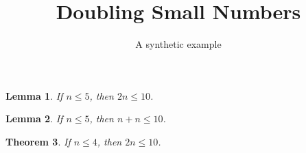 \documentclass[11pt]{article}
\title{Doubling Small Numbers}
\author{A synthetic example}
\date{}
\newtheorem{theorem}{Theorem}
\newtheorem{lemma}[theorem]{Lemma}
\newcommand{\lean}[1]{}
\begin{document}
\maketitle

\begin{lemma}\label{lem:ten}\lean{MainUse.le_ten}
If $n \le 5$, then $2n \le 10$.
\end{lemma}

\begin{lemma}\label{lem:bound}\lean{MainUse.bound_faithful, MainUse.bound_variant}
If $n \le 5$, then $n + n \le 10$.
\end{lemma}

\begin{theorem}\label{thm:main}\lean{MainUse.main_result}
If $n \le 4$, then $2n \le 10$.
\end{theorem}
\end{document}
